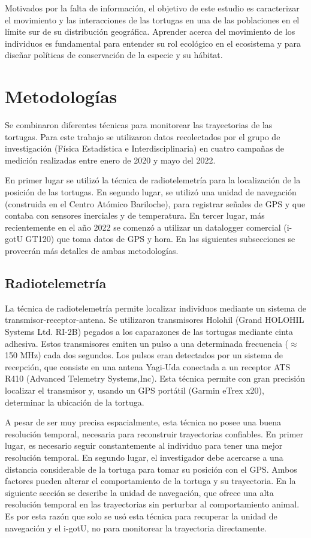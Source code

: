 Motivados por la falta de información, el objetivo de este estudio es caracterizar el movimiento y las interacciones de las tortugas en una de las poblaciones en el límite sur de su distribución geográfica. Aprender acerca del movimiento de los individuos es fundamental para entender su rol ecológico en el ecosistema y para diseñar políticas de conservación de la especie y su hábitat.
 
 
\section{Metodologías}
 
Se combinaron diferentes técnicas para monitorear las trayectorias de las tortugas. Para este trabajo se utilizaron datos recolectados por  el grupo de investigación (Física Estadística e Interdisciplinaria) en cuatro campañas de medición realizadas entre enero de 2020 y mayo del 2022.
 
En primer lugar se utilizó la técnica de radiotelemetría para la localización de la posición de las tortugas. En segundo lugar, se utilizó una unidad de navegación (construida en el Centro Atómico Bariloche), para registrar señales de GPS y que contaba con sensores inerciales y de temperatura. En tercer lugar, más recientemente en el año 2022 se comenzó a utilizar un datalogger comercial (i-gotU GT120) que toma datos de GPS y hora. En las siguientes subsecciones se proveerán más detalles de ambas metodologías.
 
\subsection{Radiotelemetría}
La técnica de radiotelemetría permite localizar individuos mediante un sistema de transmisor-receptor-antena. Se utilizaron transmisores Holohil (Grand HOLOHIL Systems Ltd. RI-2B) pegados a los caparazones de las tortugas mediante cinta adhesiva. Estos transmisores emiten un pulso a una determinada frecuencia ($\approx$150 MHz) cada dos segundos. Los pulsos eran detectados por un sistema de recepción, que consiste en una antena Yagi-Uda conectada a un receptor ATS R410 (Advanced Telemetry Systems,Inc). Esta técnica permite con gran precisión localizar el transmisor y, usando un GPS portátil (Garmin eTrex
x20), determinar la ubicación de la tortuga.
 
A pesar de ser muy precisa espacialmente, esta técnica no posee una buena resolución temporal, necesaria para reconstruir trayectorias confiables. En primer lugar, es necesario seguir constantemente al individuo para tener una mejor resolución temporal. En segundo lugar, el investigador debe acercarse a una distancia considerable de la tortuga para tomar su posición con el GPS. Ambos factores pueden alterar el comportamiento de la tortuga y su trayectoria. En la siguiente sección se describe la unidad de navegación, que ofrece una alta resolución temporal en las trayectorias sin perturbar al comportamiento animal. Es por esta razón que solo se usó esta técnica para recuperar la unidad de navegación y el i-gotU, no para monitorear la trayectoria directamente.
 
